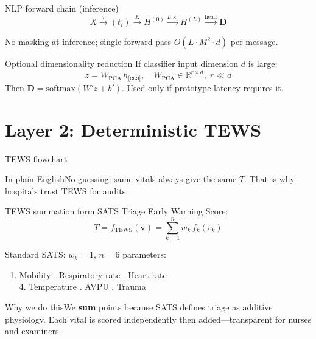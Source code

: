 \documentclass[aspectratio=169,11pt]{beamer}
\newcommand{\why}[1]{\begin{block}{Why we do this}\small #1\end{block}}
\newcommand{\plain}[1]{\begin{block}{In plain English}\small #1\end{block}}
\begin{document}
\begin{frame}{NLP forward chain (inference)}
	\[
	X \xrightarrow{\tau} (t_i)
	\xrightarrow{E} H^{(0)}
	\xrightarrow{L\times} H^{(L)}
	\xrightarrow{\text{head}} \mathbf{D}
	\]

	No masking at inference; single forward pass $O(L \cdot M^2 \cdot d)$ per message.
\end{frame}

\begin{frame}{Optional dimensionality reduction}
	If classifier input dimension $d$ is large:
	\[
	z = W_{\text{PCA}}\, h_{\texttt{[CLS]}}, \quad W_{\text{PCA}} \in \mathbb{R}^{r \times d},\; r \ll d
	\]
	Then $\mathbf{D} = \mathrm{softmax}(W' z + b')$. Used only if prototype latency requires it.
\end{frame}

\section{Layer 2: Deterministic TEWS}

\begin{frame}{TEWS flowchart}
	\begin{center}
	\end{center}

	\plain{No guessing: same vitals always give the same $T$. That is why hospitals trust TEWS for audits.}
\end{frame}

\begin{frame}{TEWS summation form}
	SATS Triage Early Warning Score:
	\[
	T = f_{\text{TEWS}}(\mathbf{v}) = \sum_{k=1}^{n} w_k\, f_k(v_k)
	\]

	Standard SATS: $w_k = 1$, $n=6$ parameters:
	\begin{enumerate}
		\item Mobility . Respiratory rate . Heart rate\\
		4. Temperature . AVPU . Trauma
	\end{enumerate}

	\why{We \textbf{sum} points because SATS defines triage as additive physiology. Each vital is scored independently then added---transparent for nurses and examiners.}
\end{frame}
\end{document}
